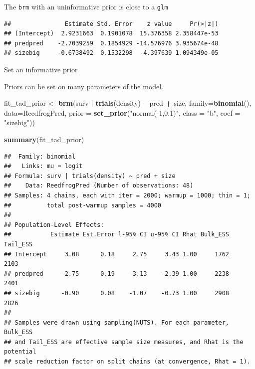 \documentclass[
  ignorenonframetext,
]{beamer}
\newenvironment{Shaded}{\begin{snugshade}}{\end{snugshade}}
\newcommand{\DataTypeTok}[1]{\textcolor[rgb]{0.13,0.29,0.53}{#1}}
\newcommand{\KeywordTok}[1]{\textcolor[rgb]{0.13,0.29,0.53}{\textbf{#1}}}
\newcommand{\NormalTok}[1]{#1}
\newcommand{\OperatorTok}[1]{\textcolor[rgb]{0.81,0.36,0.00}{\textbf{#1}}}
\newcommand{\StringTok}[1]{\textcolor[rgb]{0.31,0.60,0.02}{#1}}
\begin{document}
\begin{frame}[fragile]{The \texttt{brm} with an uninformative prior is
close to a \texttt{glm}}
\begin{verbatim}
##               Estimate Std. Error    z value     Pr(>|z|)
## (Intercept)  2.9231663  0.1901078  15.376358 2.358447e-53
## predpred    -2.7039259  0.1854929 -14.576976 3.935674e-48
## sizebig     -0.6738492  0.1532298  -4.397639 1.094349e-05
\end{verbatim}

\end{frame}

\begin{frame}[fragile]{Set an informative prior}
\protect\hypertarget{set-an-informative-prior-1}{}

Priors can be set on many parameters of the model. \scriptsize

\begin{Shaded}
\begin{Highlighting}[]
\NormalTok{fit_tad_prior <-}\StringTok{ }\KeywordTok{brm}\NormalTok{(surv }\OperatorTok{|}\StringTok{ }\KeywordTok{trials}\NormalTok{(density) }\OperatorTok{~}\StringTok{ }\NormalTok{pred }\OperatorTok{+}\StringTok{ }\NormalTok{size, }
                     \DataTypeTok{family=}\KeywordTok{binomial}\NormalTok{(), }\DataTypeTok{data=}\NormalTok{ReedfrogPred, }
                     \DataTypeTok{prior =} \KeywordTok{set_prior}\NormalTok{(}\StringTok{"normal(-1,0.1)"}\NormalTok{, }
                                       \DataTypeTok{class =} \StringTok{"b"}\NormalTok{, }
                                       \DataTypeTok{coef =} \StringTok{"sizebig"}\NormalTok{))}
\end{Highlighting}
\end{Shaded}

\begin{Shaded}
\begin{Highlighting}[]
\KeywordTok{summary}\NormalTok{(fit_tad_prior)}
\end{Highlighting}
\end{Shaded}

\begin{verbatim}
##  Family: binomial 
##   Links: mu = logit 
## Formula: surv | trials(density) ~ pred + size 
##    Data: ReedfrogPred (Number of observations: 48) 
## Samples: 4 chains, each with iter = 2000; warmup = 1000; thin = 1;
##          total post-warmup samples = 4000
## 
## Population-Level Effects: 
##           Estimate Est.Error l-95% CI u-95% CI Rhat Bulk_ESS Tail_ESS
## Intercept     3.08      0.18     2.75     3.43 1.00     1762     2103
## predpred     -2.75      0.19    -3.13    -2.39 1.00     2238     2401
## sizebig      -0.90      0.08    -1.07    -0.73 1.00     2908     2826
## 
## Samples were drawn using sampling(NUTS). For each parameter, Bulk_ESS
## and Tail_ESS are effective sample size measures, and Rhat is the potential
## scale reduction factor on split chains (at convergence, Rhat = 1).
\end{verbatim}

\end{frame}
\end{document}
